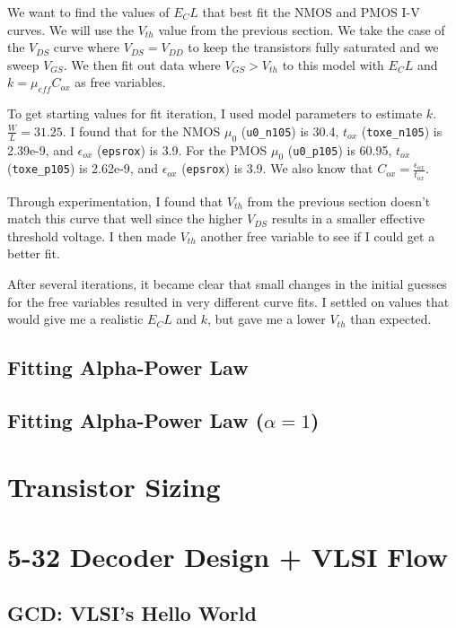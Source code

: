 \documentclass[11pt]{article}
\begin{document}
We want to find the values of $E_C L$ that best fit the NMOS and PMOS I-V curves. We will use the $V_{th}$ value from the previous section. We take the case of the $V_{DS}$ curve where $V_{DS} = V_{DD}$ to keep the transistors fully saturated and we sweep $V_{GS}$. We then fit out data where $V_{GS} > V_{th}$ to this model with $E_C L$ and $k = \mu_{eff} C_{ox}$ as free variables.

To get starting values for fit iteration, I used model parameters to estimate $k$. $\frac{W}{L} = 31.25$. I found that for the NMOS $\mu_0$ (\verb|u0_n105|) is 30.4, $t_{ox}$ (\verb|toxe_n105|) is 2.39e-9, and $\epsilon_{ox}$ (\verb|epsrox|) is 3.9. For the PMOS $\mu_0$ (\verb|u0_p105|) is 60.95, $t_{ox}$ (\verb|toxe_p105|) is 2.62e-9, and $\epsilon_{ox}$ (\verb|epsrox|) is 3.9. We also know that $C_{ox} = \frac{\epsilon_{ox}}{t_{ox}}$.

Through experimentation, I found that $V_{th}$ from the previous section doesn't match this curve that well since the higher $V_{DS}$ results in a smaller effective threshold voltage. I then made $V_{th}$ another free variable to see if I could get a better fit.

After several iterations, it became clear that small changes in the initial guesses for the free variables resulted in very different curve fits. I settled on values that would give me a realistic $E_C L$ and $k$, but gave me a lower $V_{th}$ than expected.

\subsection{Fitting Alpha-Power Law}

\subsection{Fitting Alpha-Power Law ($\alpha = 1$)}

\section{Transistor Sizing}

\section{5-32 Decoder Design + VLSI Flow}

\subsection{GCD: VLSI's Hello World}
\end{document}
